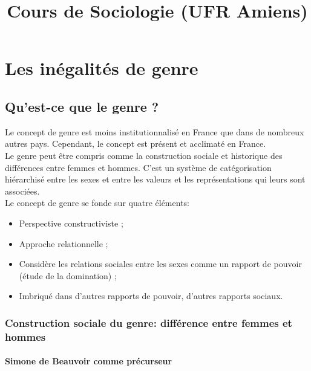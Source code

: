 \documentclass[10pt, a4paper, openany]{book}
\date{}
\title{Cours de Sociologie (UFR Amiens)}
\begin{document}
\maketitle
\tableofcontents

\part{Les inégalités de genre}

\chapter{Qu'est-ce que le genre ?}

Le concept de genre est moins institutionnalisé en France que dans de nombreux autres pays. Cependant, le concept est présent et acclimaté en France. \\
Le genre peut être compris comme la construction sociale et historique des différences entre femmes et hommes. C'est un système de catégorisation hiérarchisé entre les sexes et entre les valeurs et les représentations qui leurs sont associées. \\ 
Le concept de genre se fonde sur quatre éléments:
\begin{itemize}
\item Perspective constructiviste ;
\item Approche relationnelle ;
\item Considère les relations sociales entre les sexes comme un rapport de pouvoir (étude de la domination) ;
\item Imbriqué dans d'autres rapports de pouvoir, d'autres rapports sociaux.
\end{itemize}

\section{Construction sociale du genre: différence entre femmes et hommes}

\subsection{Simone de Beauvoir comme précurseur}
\end{document}
